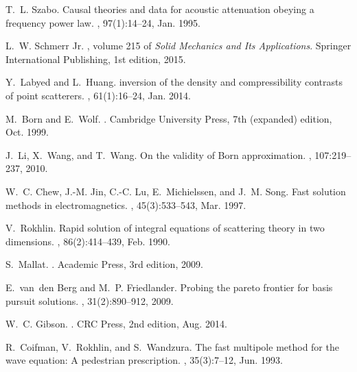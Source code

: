 \documentclass[10pt,twocolumn,romanappendices,final]{IEEEtran}
\begin{document}
\begin{thebibliography}{100}
T.~L. Szabo.
\newblock Causal theories and data for acoustic attenuation obeying a frequency
  power law.
, 97(1):14--24, Jan. 1995.

L.~W. {Schmerr Jr.}
, volume 215 of {\em
  Solid Mechanics and Its Applications}.
\newblock Springer International Publishing, 1st edition, 2015.

Y.~Labyed and L.~Huang.
 inversion of the density and compressibility contrasts of
  point scatterers.
,
  61(1):16--24, Jan. 2014.

M.~Born and E.~Wolf.
.
\newblock Cambridge University Press, 7th (expanded) edition, Oct. 1999.

J.~Li, X.~Wang, and T.~Wang.
\newblock On the validity of {B}orn approximation.
, 107:219--237, 2010.

W.~C. Chew, J.-M. Jin, C.-C. Lu, E.~Michielssen, and J.~M. Song.
\newblock Fast solution methods in electromagnetics.
, 45(3):533--543, Mar. 1997.

V.~Rokhlin.
\newblock Rapid solution of integral equations of scattering theory in two
  dimensions.
, 86(2):414--439, Feb. 1990.

S.~Mallat.
.
\newblock Academic Press, 3rd edition, 2009.

E.~van~den Berg and M.~P. Friedlander.
\newblock Probing the pareto frontier for basis pursuit solutions.
, 31(2):890--912, 2009.

W.~C. Gibson.
.
\newblock CRC Press, 2nd edition, Aug. 2014.

R.~Coifman, V.~Rokhlin, and S.~Wandzura.
\newblock The fast multipole method for the wave equation: A pedestrian
  prescription.
, 35(3):7--12, Jun. 1993.


\end{thebibliography}
\end{document}
